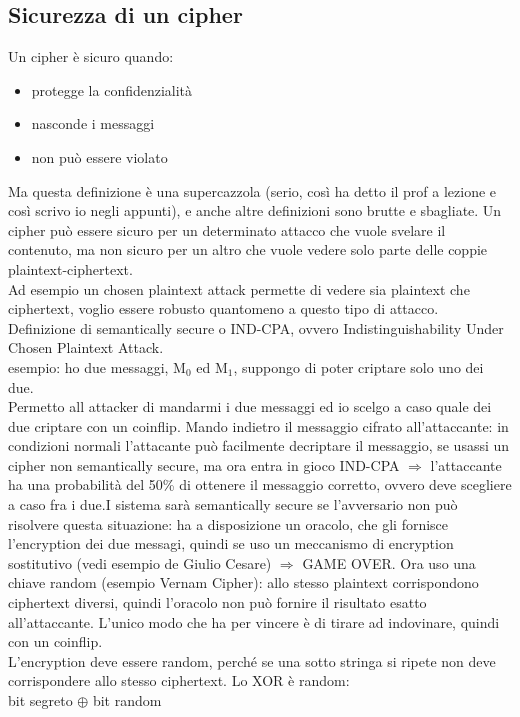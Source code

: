 \documentclass[16px]{article}
\begin{document}
\subsection{Sicurezza di un cipher}
Un cipher è sicuro quando:
\begin{itemize}
\item protegge la confidenzialità
\item nasconde i messaggi
\item non può essere violato
\end{itemize}
Ma questa definizione è una supercazzola (serio, così ha detto il prof a lezione e così scrivo io negli appunti), e anche altre definizioni sono brutte e sbagliate.
Un cipher può essere sicuro per un determinato attacco che vuole svelare il contenuto, ma non sicuro per un altro che vuole vedere solo parte delle coppie plaintext-ciphertext.\\ Ad esempio un chosen plaintext attack permette di vedere sia plaintext che ciphertext, voglio essere robusto quantomeno a questo tipo di attacco.\\ Definizione di semantically secure o IND-CPA, ovvero Indistinguishability Under Chosen Plaintext Attack. \\ esempio: ho due messaggi, M$_{0}$ ed M$_{1}$, suppongo di poter criptare solo uno dei due. \\ Permetto all attacker di mandarmi i due messaggi ed io scelgo a caso quale dei due criptare con un coinflip. Mando indietro il messaggio cifrato all'attaccante: in condizioni normali l'attacante può facilmente decriptare il messaggio, se usassi un cipher non semantically secure, ma ora entra in gioco IND-CPA $\Rightarrow$ l'attaccante ha una probabilità del 50\% di ottenere il messaggio corretto, ovvero deve scegliere a caso fra i due.I sistema sarà semantically secure se l'avversario non può risolvere questa situazione: ha a disposizione un oracolo, che gli fornisce l'encryption dei due messagi, quindi se uso un meccanismo di encryption sostitutivo (vedi esempio de Giulio Cesare) $\Rightarrow$ GAME OVER. Ora uso una chiave random (esempio Vernam Cipher): allo stesso plaintext corrispondono ciphertext diversi, quindi l'oracolo non può fornire il risultato esatto all'attaccante. L'unico modo che ha per vincere è di tirare ad indovinare, quindi con un coinflip.\\ L'encryption deve essere random, perché se una sotto stringa si ripete non deve corrispondere allo stesso ciphertext. Lo XOR è random: \\
bit segreto $\oplus$ bit random\\
\end{document}
